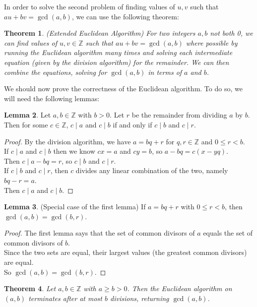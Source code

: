 \documentclass[11pt]{amsart}
\newtheorem{theorem}{Theorem}[section]
\theoremstyle{definition}
\newtheorem{lemma}[theorem]{Lemma}
\newcommand{\integers}{\mathbb{Z}}
\begin{document}
In order to solve the second problem of finding values of $u, v$ such that $au + bv = \gcd(a, b)$, we can use the following theorem:
\begin{theorem}(Extended Euclidean Algorithm)
	For two integers $a, b$ not both 0, we can find values of $u, v \in \integers$ such that $au + bv = \gcd(a, b)$ where possible
	by running the Euclidean algorithm many times and solving each intermediate equation (given by the division algorithm) for the remainder.
	We can then combine the equations, solving for $\gcd(a, b)$ in terms of $a$ and $b$.
\end{theorem}

We should now prove the correctness of the Euclidean algorithm. To do so, we will need the following lemmas:
\begin{lemma}
	Let $a, b \in \integers$ with $b > 0$. Let $r$ be the remainder from dividing $a$ by $b$. Then for some $c \in \integers$, $c \mid a$ and
	$c \mid b$ if and only if $c \mid b$ and $c \mid r$.
\end{lemma}
\begin{proof}
	By the division algorithm, we have $a = bq + r$ for $q, r \in \integers$ and $0 \leq r < b$. \\
	If $c \mid a$ and $c \mid b$ then we know $cx = a$ and $cy = b$, so $a - bq = c(x - yq)$. \\
	Then $c \mid a - bq = r$, so $c \mid b$ and $c \mid r$. \\
	If $c \mid b$ and $c \mid r$, then $c$ divides any linear combination of the two, namely $bq - r = a$. \\
	Then $c \mid a$ and $c \mid b$.
\end{proof}
\begin{lemma}(Special case of the first lemma)
	If $a = bq + r$ with $0 \leq r < b$, then $\gcd(a, b) = \gcd(b, r)$.
\end{lemma}
\begin{proof}
	The first lemma says that the set of common divisors of $a$ equals the set of common divisors of $b$. \\
	Since the two sets are equal, their largest values (the greatest common divisors) are equal. \\
	So $\gcd(a, b) = \gcd(b, r)$.
\end{proof}
\begin{theorem}
	Let $a, b \in \integers$ with $a \geq b > 0$. Then the Euclidean algorithm on $(a, b)$ terminates after at most $b$ divisions, returning
	$\gcd(a, b)$.
\end{theorem}
\end{document}

